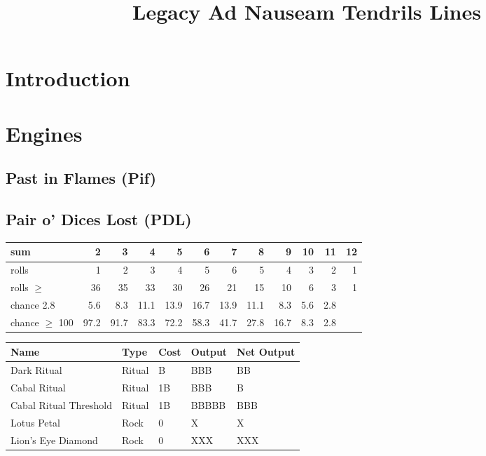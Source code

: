 \documentclass{article}
\title{Legacy Ad Nauseam Tendrils Lines}
\begin{document}
\maketitle
\begin{abstract}
\end{abstract}
\section{Introduction}
\section{Engines}
\subsection{Past in Flames (Pif)}
\subsection{Pair o' Dices Lost (PDL)}

\begin{tabular}{lrrrrrrrrrrr}
\toprule
sum				&2		&3		&4		&5		&6		&7		&8		&9		&10		&11		&12\\
\midrule
rolls			&1		&2		&3		&4		&5		&6		&5		&4		&3		&2		&1\\
rolls $\geq$	&36		&35		&33		&30		&26		&21		&15		&10		&6		&3		&1\\
\midrule
chance			2.8		&5.6	&8.3	&11.1	&13.9	&16.7	&13.9	&11.1	&8.3	&5.6	&2.8\\
chance $\geq$	100		&97.2	&91.7	&83.3	&72.2	&58.3	&41.7	&27.8	&16.7	&8.3	&2.8\\
\bottomrule
\end{tabular}

\begin{tabular}{@{}lllll@{}}
\toprule
\textbf{Name}				&\textbf{Type} &\textbf{Cost}	&\textbf{Output}	&\textbf{Net Output} \\ 
\midrule
Dark Ritual					&Ritual			&B				&BBB				&BB\\
Cabal Ritual				&Ritual			&1B				&BBB				&B\\
Cabal Ritual Threshold		&Ritual			&1B				&BBBBB				&BBB\\
Lotus Petal					&Rock			&0				&X					&X\\
Lion's Eye Diamond			&Rock			&0				&XXX				&XXX\\
\bottomrule
\end{tabular}


\begin{tabular}{lll}
\end{tabular}
\end{document}
